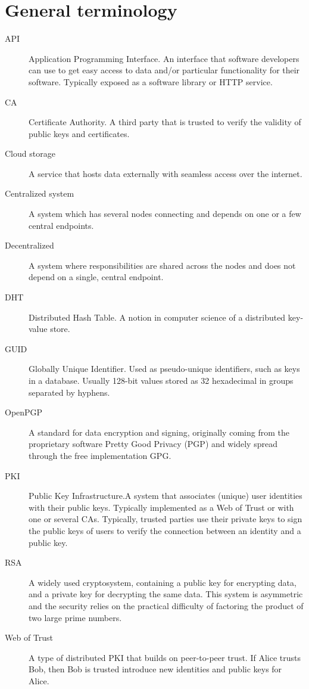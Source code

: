 \section{General terminology}
\begin{description}
  \item[API] Application Programming Interface. An interface that software developers can use to get easy access to data and/or particular functionality for their software. Typically exposed as a software library or HTTP service.
  \item[CA] Certificate Authority. A third party that is trusted to verify the validity of public keys and certificates.
  \item[Cloud storage] A service that hosts data externally with seamless access over the internet.
  \item[Centralized system] A system which has several nodes connecting and depends on one or a few central endpoints.
  \item[Decentralized] A system where responsibilities are shared across the nodes and does not depend on a single, central endpoint.
  \item[DHT] Distributed Hash Table. A notion in computer science of a distributed key-value store.
  \item[GUID] Globally Unique Identifier. Used as pseudo-unique identifiers, such as keys in a database. Usually 128-bit values stored as 32 hexadecimal in groups separated by hyphens. 
  \item[OpenPGP] A standard for data encryption and signing, originally coming from the proprietary software Pretty Good Privacy (PGP) and widely spread through the free implementation GPG.
  \item[PKI] Public Key Infrastructure.A system that associates (unique) user identities with their public keys. Typically implemented as a Web of Trust or with one or several CAs. Typically, trusted parties use their private keys to sign the public keys of users to verify the connection between an identity and a public key.
  \item[RSA] A widely used cryptosystem, containing a public key for encrypting data, and a private key for decrypting the same data. This system is asymmetric and the security relies on the practical difficulty of factoring the product of two large prime numbers.
  \item[Web of Trust] A type of distributed PKI that builds on peer-to-peer trust. If Alice trusts Bob, then Bob is trusted introduce new identities and public keys for Alice.
\end{description}

